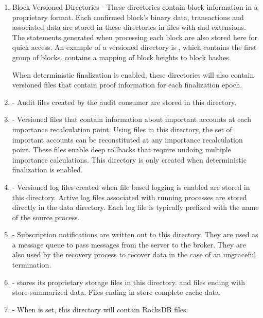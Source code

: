 \begin{enumerate}
	\item{Block Versioned Directories -
		These directories contain block information in a proprietary format.
		Each confirmed block's binary data, transactions and associated data are stored in these directories in files with  and  extensions.
		The statements  generated when processing each block are also stored here for quick access.
		An example of a versioned directory is , which contains the first group of blocks.
		 contains a mapping of block heights to block hashes.

		When deterministic finalization is enabled, these directories will also contain versioned  files that contain proof information for each finalization epoch.
	}
	\item{ - Audit files created by the audit consumer  are stored in this directory.}
	\item{ -
		Versioned files that contain information about important accounts at each importance recalculation point.
		Using files in this directory, the set of important accounts can be reconstituted at any importance recalculation point.
		These files enable deep rollbacks that require undoing multiple importance calculations.
		This directory is only created when deterministic finalization is enabled.
	}
	\item{ -
		Versioned log files created when file based logging is enabled are stored in this directory.
		Active log files associated with running processes are stored directly in the data directory.
		Each log file is typically prefixed with the name of the source process.
	}
	\item{ -
		Subscription notifications are written out to this directory.
		They are used as a message queue to pass messages from the server to the broker.
		They are also used by the recovery process to recover data in the case of an ungraceful termination.
	}
	\item{ -
		\codenamespace stores its proprietary storage files in this directory.
		 and files ending with  store summarized data.
		Files ending in  store complete cache data.
	}
	\item{ - When  is set, this directory will contain RocksDB files.}

\end{enumerate}
